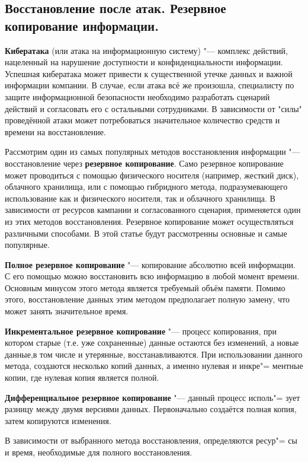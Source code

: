 \newpage
\subsection{Восстановление после атак. Резервное копирование информации.}
    \textbf{Кибератака} (или атака на информационную систему) "--- комплекс действий, нацеленный на нарушение доступности и конфиденциальности информации.
    Успешная кибератака может привести к существенной утечке данных и важной информации компании.
    В случае, если атака всё же произошла, специалисту по защите информационной безопасности необходимо разработать сценарий действий и согласовать его 
    с остальными сотрудниками. В зависимости от "силы" проведённой атаки может потребоваться значительное количество средств и времени на восстановление.

    Рассмотрим один из самых популярных методов восстановления информации "--- восстановление через \textbf{резервное копирование}. Само резервное копирование 
    может проводиться с помощью физического носителя (например, жесткий диск), облачного хранилища, или с помощью гибридного метода, подразумевающего использование
    как и физического носителя, так и облачного хранилища. В зависимости от ресурсов кампании и согласованного сценария, применяется один из этих методов восстановления.
    Резервное копирование может осуществляться различными способами. В этой статье будут рассмотренны основные и самые популярные.\cite{main_methods}

    \textbf{Полное резервное копирование} "--- копирование абсолютно всей информации. С его помощью можно восстановить всю информацию в любой момент времени. Основным минусом
    этого метода является требуемый объём памяти. Помимо этого, восстановление данных этим методом предполагает полную замену, что может занять значительное время.

    \textbf{Инкрементальное резервное копирование} "--- процесс копирования, при котором старые (т.е. уже сохраненные) данные остаются без изменений, а новые данные,в том числе и утерянные, 
    восстанавливаются. При использовании данного метода, создаются несколько копий данных, а именно нулевая и инкре"=
    ментные копии, где нулевая копия является полной.

    \textbf{Дифференциальное резервное копирование} "--- данный процесс исполь"=
    зует разницу между двумя версиями данных. Первоначально создаётся полная копия, затем копируются изменения.

    В зависимости от выбранного метода восстановления, определяются ресур"=
    сы и время, необходимые для полного восстановления.


